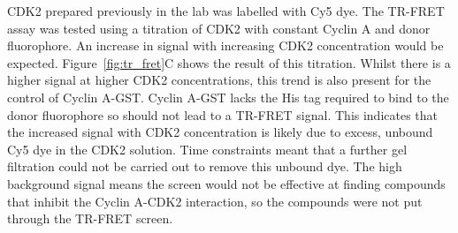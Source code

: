 CDK2 prepared previously in the lab was labelled with Cy5 dye.
The TR-FRET assay was tested using a titration of CDK2 with constant Cyclin A and donor fluorophore.
An increase in signal with increasing CDK2 concentration would be expected.
Figure~\ref{fig:tr_fret}C shows the result of this titration.
Whilst there is a higher signal at higher CDK2 concentrations, this trend is also present for the control of Cyclin A-GST.
Cyclin A-GST lacks the His tag required to bind to the donor fluorophore so should not lead to a TR-FRET signal.
This indicates that the increased signal with CDK2 concentration is likely due to excess, unbound Cy5 dye in the CDK2 solution.
Time constraints meant that a further gel filtration could not be carried out to remove this unbound dye.
The high background signal means the screen would not be effective at finding compounds that inhibit the Cyclin A-CDK2 interaction, so the compounds were not put through the TR-FRET screen.

